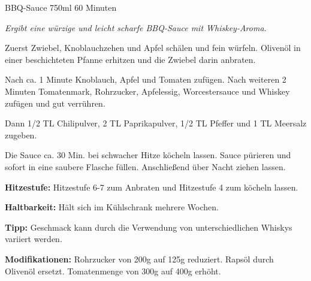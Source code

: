 \documentclass[
  DIV=11,%
  pagesize,%
  fontsize=11pt,%
  paper=a4,%
]{scrartcl}
\begin{document}
\begin{recipe}{BBQ-Sauce} {750ml} {60 Minuten}

\freeform
\textit{Ergibt eine würzige und leicht scharfe BBQ-Sauce mit Whiskey-Aroma.}


Zuerst Zwiebel, Knoblauchzehen und Apfel schälen und fein würfeln.
Olivenöl in einer beschichteten Pfanne erhitzen und die Zwiebel darin anbraten.


Nach ca. 1 Minute Knoblauch, Apfel und Tomaten zufügen.
Nach weiteren 2 Minuten Tomatenmark, Rohrzucker, Apfelessig, Worcestersauce und Whiskey zufügen und gut verrühren.


Dann 1/2 TL Chilipulver, 2 TL Paprikapulver, 1/2 TL Pfeffer und 1 TL Meersalz zugeben.

\newstep
Die Sauce ca. 30 Min. bei schwacher Hitze köcheln lassen.
Sauce pürieren und sofort in eine saubere Flasche füllen.
Anschließend über Nacht ziehen lassen.

\freeform
\hrulefill

\freeform
\textbf{Hitzestufe:}
Hitzestufe 6-7 zum Anbraten und Hitzestufe 4 zum köcheln lassen.

\freeform 
\textbf{Haltbarkeit:}
Hält sich im Kühlschrank mehrere Wochen.

\freeform 
\textbf{Tipp:}
Geschmack kann durch die Verwendung von unterschiedlichen Whiskys variiert werden.

\freeform 
\textbf{Modifikationen:}
Rohrzucker von 200g auf 125g reduziert. Rapsöl durch Olivenöl ersetzt. Tomatenmenge von 300g auf 400g erhöht.

\end{recipe}
\end{document}
